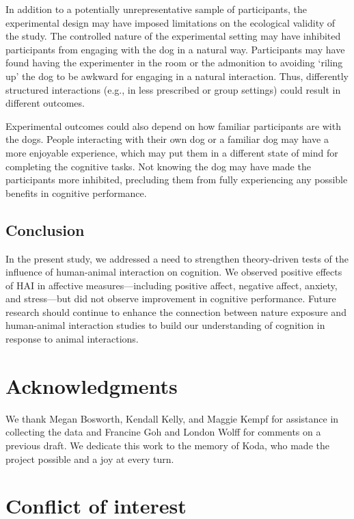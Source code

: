\documentclass[
  english,
  pub,floatsintext]{apa6}
\begin{document}
In addition to a potentially unrepresentative sample of participants, the experimental design may have imposed limitations on the ecological validity of the study. The controlled nature of the experimental setting may have inhibited participants from engaging with the dog in a natural way. Participants may have found having the experimenter in the room or the admonition to avoiding `riling up' the dog to be awkward for engaging in a natural interaction. Thus, differently structured interactions (e.g., in less prescribed or group settings) could result in different outcomes.

Experimental outcomes could also depend on how familiar participants are with the dogs. People interacting with their own dog or a familiar dog may have a more enjoyable experience, which may put them in a different state of mind for completing the cognitive tasks. Not knowing the dog may have made the participants more inhibited, precluding them from fully experiencing any possible benefits in cognitive performance.

\hypertarget{conclusion}{%
\subsection{Conclusion}\label{conclusion}}

In the present study, we addressed a need to strengthen theory-driven tests of the influence of human-animal interaction on cognition. We observed positive effects of HAI in affective measures---including positive affect, negative affect, anxiety, and stress---but did not observe improvement in cognitive performance. Future research should continue to enhance the connection between nature exposure and human-animal interaction studies to build our understanding of cognition in response to animal interactions.

\hypertarget{acknowledgments}{%
\section{Acknowledgments}\label{acknowledgments}}

We thank Megan Bosworth, Kendall Kelly, and Maggie Kempf for assistance in collecting the data and Francine Goh and London Wolff for comments on a previous draft. We dedicate this work to the memory of Koda, who made the project possible and a joy at every turn.

\hypertarget{conflict-of-interest}{%
\section{Conflict of interest}\label{conflict-of-interest}}
\end{document}
